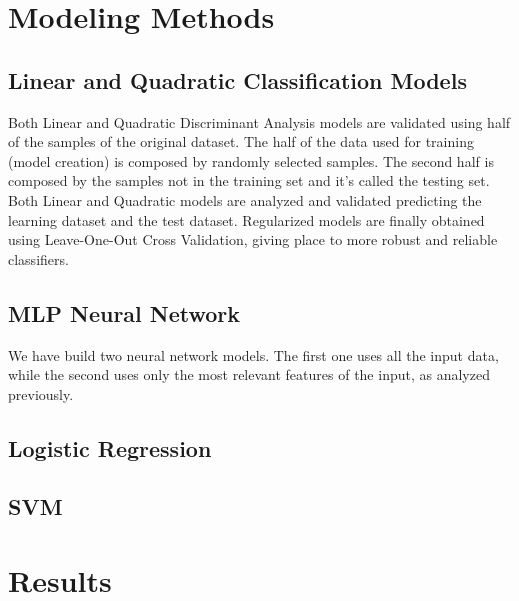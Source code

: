 \documentclass[english]{scrartcl}
\begin{document}
\section{Modeling Methods}

    \subsection{Linear and Quadratic Classification Models}\label{sec:methods:ldaqda}
    Both Linear and Quadratic Discriminant Analysis models are validated using
    half of the samples of the original dataset. The half of the data used for training (model creation) is composed by
    randomly selected samples. The second half is composed by the samples not in the training set and it's called the 
    testing set. Both Linear and Quadratic models are analyzed and validated predicting the learning dataset and the test
    dataset. Regularized models are finally obtained using Leave-One-Out Cross Validation, giving place to more robust
    and reliable classifiers.
    
    \subsection{MLP Neural Network}\label{sec:methods:nnet}
    We have build two neural network models. The first one uses all the input data, while the second uses only the most
    relevant features of the input, as analyzed previously.
    
    \subsection{Logistic Regression}
    
    \subsection{SVM}

\section{Results}
\end{document}
